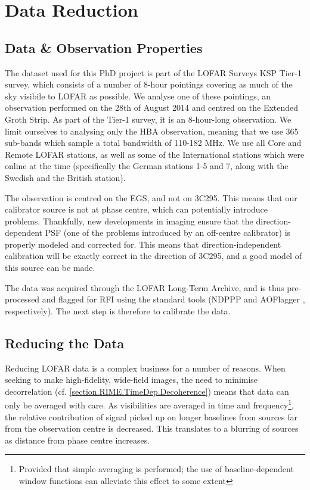 \section{Data Reduction}


\subsection{Data \& Observation Properties}
\pg
The dataset used for this PhD project is part of the LOFAR Surveys KSP Tier-1 survey, which consists of a number of 8-hour pointings covering as much of the sky visibile to LOFAR as possible. We analyse one of these pointings, an observation performed on the 28th of August 2014 and centred on the Extended Groth Strip. As part of the Tier-1 survey, it is an 8-hour-long observation. We limit ourselves to analysing only the HBA observation, meaning that we use 365 sub-bands which sample a total bandwidth of 110-182 MHz. We use all Core and Remote LOFAR stations, as well as some of the International stations which were online at the time (specifically the German stations 1-5 and 7, along with the Swedish and the British station).

\pg
The observation is centred on the EGS, and not on 3C295. This means that our calibrator source is not at phase centre, which can potentially introduce problems. Thankfully, new developments in imaging  ensure that the direction-dependent PSF (one of the problems introduced by an off-centre calibrator) is properly modeled and corrected for. This means that direction-independent calibration will be exactly correct in the direction of 3C295, and a good model of this source can be made.

\pg
The data was acquired through the LOFAR Long-Term Archive, and is thus pre-processed and flagged for RFI using the standard tools (NDPPP and AOFlagger , respectively). The next step is therefore to calibrate the data.

\subsection{Reducing the Data}

\pg
Reducing LOFAR data is a complex business for a number of reasons. When seeking to make high-fidelity, wide-field images, the need to minimise decorrelation (cf. \cref{section.RIME.TimeDep.Decoherence}) means that data can only be averaged with care. As visibilities are averaged in time and frequency\footnote{Provided that simple averaging is performed; the use of baseline-dependent window functions can alleviate this effect to some extent}, the relative contribution of signal picked up on longer baselines from sources far from the observation centre is decreased. This translates to a blurring of sources as distance from phase centre increases.

